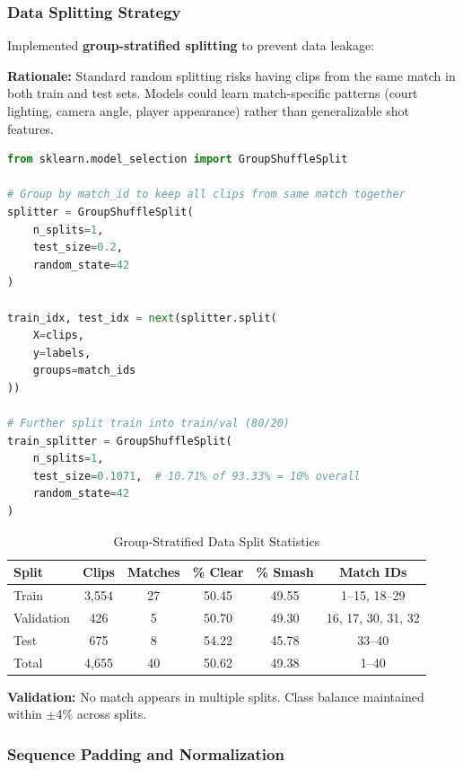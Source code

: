 \documentclass[11pt,a4paper]{article}
\begin{document}
\subsubsection{Data Splitting Strategy}

Implemented \textbf{group-stratified splitting} to prevent data leakage:

\textbf{Rationale:} Standard random splitting risks having clips from the same match in both train and test sets. Models could learn match-specific patterns (court lighting, camera angle, player appearance) rather than generalizable shot features.

\begin{lstlisting}[language=Python, caption=Group-Stratified Split Implementation]
from sklearn.model_selection import GroupShuffleSplit

# Group by match_id to keep all clips from same match together
splitter = GroupShuffleSplit(
    n_splits=1,
    test_size=0.2,
    random_state=42
)

train_idx, test_idx = next(splitter.split(
    X=clips,
    y=labels,
    groups=match_ids
))

# Further split train into train/val (80/20)
train_splitter = GroupShuffleSplit(
    n_splits=1,
    test_size=0.1071,  # 10.71% of 93.33% = 10% overall
    random_state=42
)
\end{lstlisting}

\begin{table}[H]
\centering
\caption{Group-Stratified Data Split Statistics}
\begin{tabular}{lccccc}
\toprule
Split & Clips & Matches & \% Clear & \% Smash & Match IDs \\
\midrule
Train & 3,554 & 27 & 50.45 & 49.55 & 1--15, 18--29 \\
Validation & 426 & 5 & 50.70 & 49.30 & 16, 17, 30, 31, 32 \\
Test & 675 & 8 & 54.22 & 45.78 & 33--40 \\
\midrule
Total & 4,655 & 40 & 50.62 & 49.38 & 1--40 \\
\bottomrule
\end{tabular}
\end{table}

\textbf{Validation:} No match appears in multiple splits. Class balance maintained within $\pm$4\% across splits.

\subsubsection{Sequence Padding and Normalization}
\end{document}
